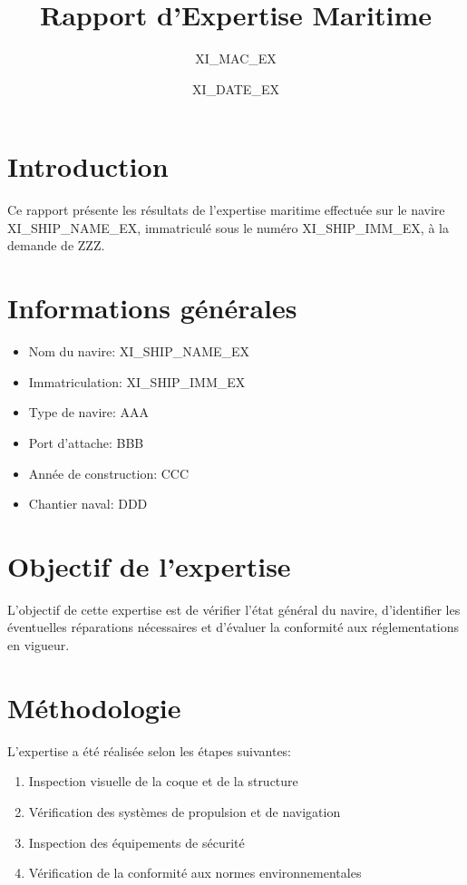 \documentclass[12pt,a4paper]{article}
\title{Rapport d'Expertise Maritime}
\author{XI_MAC_EX}
\date{{\Large XI_DATE_EX}}
\begin{document}
\maketitle
\tableofcontents
\newpage

\section{Introduction}
Ce rapport présente les résultats de l'expertise maritime effectuée sur le navire XI_SHIP_NAME_EX, immatriculé sous le numéro XI_SHIP_IMM_EX, à la demande de ZZZ.

\section{Informations générales}
\begin{itemize}
    \item Nom du navire: XI_SHIP_NAME_EX
    \item Immatriculation: XI_SHIP_IMM_EX
    \item Type de navire: AAA
    \item Port d'attache: BBB
    \item Année de construction: CCC
    \item Chantier naval: DDD
\end{itemize}

\section{Objectif de l'expertise}
L'objectif de cette expertise est de vérifier l'état général du navire, d'identifier les éventuelles réparations nécessaires et d'évaluer la conformité aux réglementations en vigueur.

\section{Méthodologie}
L'expertise a été réalisée selon les étapes suivantes:
\begin{enumerate}
    \item Inspection visuelle de la coque et de la structure
    \item Vérification des systèmes de propulsion et de navigation
    \item Inspection des équipements de sécurité
    \item Vérification de la conformité aux normes environnementales
\end{enumerate}
\end{document}
